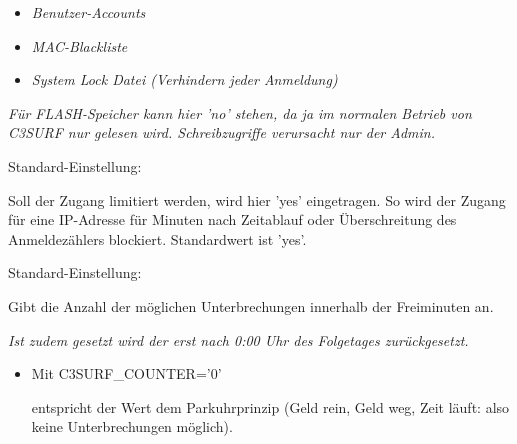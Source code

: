 \begin{itemize}
\begin{description}
  \begin{itemize}
  \item \emph{Benutzer-Accounts}
  \item \emph{MAC-Blackliste}
  \item \emph{System Lock Datei (Verhindern jeder Anmeldung)}\\
  \end{itemize}
  
  \emph{Für FLASH-Speicher kann hier 'no' stehen, da ja im normalen Betrieb von
  C3SURF nur gelesen wird. Schreibzugriffe verursacht nur der Admin.}


  Standard-Einstellung: 

  Soll der Zugang limitiert werden, wird hier 'yes' eingetragen. So wird
  der Zugang für eine IP-Adresse für  Minuten nach
  Zeitablauf oder Überschreitung des Anmeldezählers blockiert. Standardwert ist 'yes'.



  Standard-Einstellung: 

  Gibt die Anzahl der möglichen Unterbrechungen innerhalb der
  Freiminuten an.


  \emph{Ist zudem  gesetzt wird der
   erst nach 0:00 Uhr des Folgetages zurückgesetzt.}

  \begin{itemize}
    \item{Mit C3SURF\_COUNTER='0'}
    
    entspricht der Wert dem Parkuhrprinzip (Geld rein, Geld weg, Zeit läuft: also keine
    Unterbrechungen möglich).
  

\end{itemize}
\end{description}
\end{itemize}
